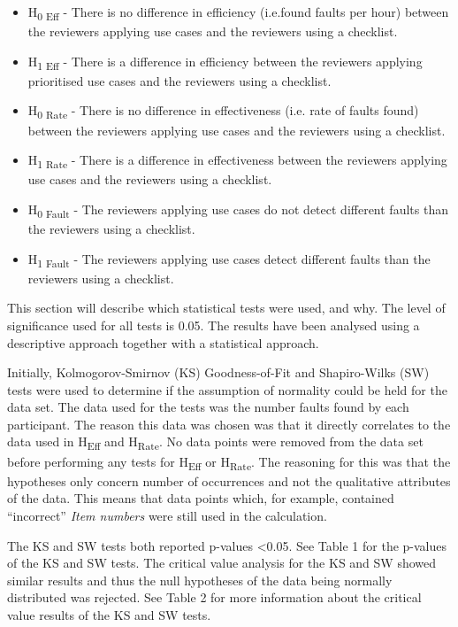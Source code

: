 \documentclass[10pt,twocolumn]{article}
\begin{document}
\begin{itemize}
\item H\textsubscript{0 Eff} - There is no difference in efficiency (i.e.found faults per hour) between the reviewers applying use cases and the reviewers using a checklist.
\item H\textsubscript{1 Eff} - There is a difference in efficiency between the reviewers applying prioritised use cases and the reviewers using a checklist.
\item H\textsubscript{0 Rate} - There is no difference in effectiveness (i.e. rate of faults found) between the reviewers applying use cases and the reviewers using a checklist.
\item H\textsubscript{1 Rate} - There is a difference in effectiveness between the reviewers applying use cases and the reviewers using a checklist.
\item H\textsubscript{0 Fault} - The reviewers applying use cases do not detect different faults than the reviewers using a checklist.
\item H\textsubscript{1 Fault} - The reviewers applying use cases detect different faults than the reviewers using a checklist.

\end{itemize}

This section will describe which statistical tests were used, and why. The level of significance used for all tests is 0.05. The results have been analysed using a descriptive approach together with a statistical approach.

Initially, Kolmogorov-Smirnov (KS) Goodness-of-Fit and Shapiro-Wilks (SW) tests were used to determine if the assumption of normality could be held for the data set. The data used for the tests was the number faults found by each participant. The reason this data was chosen was that it directly correlates to the data used in H\textsubscript{Eff} and H\textsubscript{Rate}. No data points were removed from the data set before performing any tests for H\textsubscript{Eff} or H\textsubscript{Rate}. The reasoning for this was that the hypotheses only concern number of occurrences and not the qualitative attributes of the data. This means that data points which, for example, contained ``incorrect'' \textit{Item numbers} were still used in the calculation.

The KS and SW tests both reported p-values \textless 0.05. See Table 1 for the p-values of the KS and SW tests. The critical value analysis for the KS and SW showed similar results and thus the null hypotheses of the data being normally distributed was rejected. See Table 2 for more information about the critical value results of the KS and SW tests.
\end{document}

